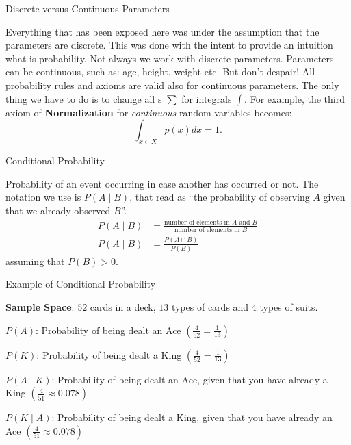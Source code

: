 \begin{frame}{Discrete versus Continuous Parameters}

	Everything that has been exposed here was under the assumption that the parameters are discrete.
	This was done with the intent to provide an intuition what is probability.
	Not always we work with discrete parameters.
	Parameters can be continuous, such as: age, height, weight etc. But don't despair!
	All probability rules and axioms are valid also for continuous parameters.
	The only thing we have to do is to change all s $\sum$ for integrals $\int$.
	For example, the third axiom of \textbf{Normalization} for \textit{continuous} random variables becomes: $$ \int_{x \in X} p(x) dx = 1.
	$$
\end{frame}

\begin{frame}{Conditional Probability}
	\begin{defn}
		Probability of an event occurring in case another has occurred or not. \newline \newline
		The notation we use is $P( A \mid B )$, that read as ``the probability of
		observing $A$ given that we already observed $B$''. \newline \newline
		$$
			\begin{aligned}
				P(A \mid B) & = \frac{\text{number of elements in $A$ and $B$}}{\text{number of elements in $B$}} \\ P(A \mid B) & = \frac{P(A \cap B)}{P(B)}
			\end{aligned}
		$$ \newline \hspace{0.7\textwidth} {\footnotesize assuming that $P(B) > 0$}.
	\end{defn}
\end{frame}

\begin{frame}{Example of Conditional Probability}
	\begin{example}
		\begin{vfilleditems}
			\item \textbf{Sample Space}: $52$ cards in a deck, $13$ types of cards and $4$ types of suits.
			\item $P(A)$: Probability of being dealt an Ace $\left( \frac{4}{52} = \frac{1}{13}\right)$
			\item $P(K)$: Probability of being dealt a King $\left( \frac{4}{52} = \frac{1}{13} \right)$
			\item $P(A \mid K)$: Probability of being dealt an Ace, given that you have already a King $\left( \frac{4}{51} \approx 0.078 \right)$
			\item $P(K \mid A)$: Probability of being dealt a King, given that you have already an Ace $\left( \frac{4}{51} \approx 0.078 \right)$
		\end{vfilleditems}
	\end{example}
\end{frame}

